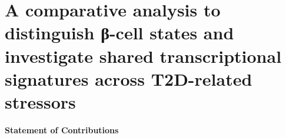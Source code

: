 
\chapter{A comparative analysis to distinguish β-cell states and investigate shared transcriptional signatures across T2D-related stressors
}
\label{chapter3}
\newpage

\begin{Comment2}
\vspace{3mm}
\label{contr:chapter2}
\hspace{-3mm}
\textbf{Statement of Contributions} \\\\

\end{Comment2}

\clearpage



